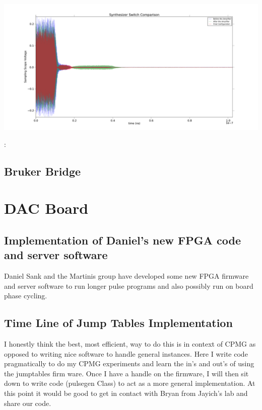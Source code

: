 \documentclass[10pt]{book}
\begin{document}
{{\begin{minipage}{0.7\linewidth}
\includegraphics[width=\linewidth]{150409SynthesizerSwitchComparison.pdf}\label{fig:noVA}

\hrulefill 

{\color{red}{\tiny file:}:}\begin{tiny}\end{tiny} 

\hrulefill

\end{minipage}} 



\section{Bruker Bridge}

\chapter{DAC Board}
\section{Implementation of Daniel's new FPGA code and server software}
Daniel Sank and the Martinis group have developed some new FPGA firmware and server software to run longer pulse programs and also possibly run on board phase cycling.

\section{Time Line of Jump Tables Implementation}

I honestly think the best, most efficient, way to do this is in context of CPMG as opposed to writing nice software to handle general instances. Here I write code pragmatically to do my CPMG experiments and learn the in's and out's of using the jumptables firm ware. Once I have a handle on the firmware, I will then sit down to write code (pulsegen Class) to act as a more general implementation. At this point it would be good to get in contact with Bryan from Jayich's lab and share our code. \\

}
\end{document}
